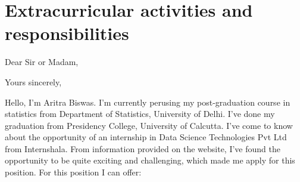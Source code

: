 \documentclass[11pt,a4paper,sans]{moderncv}        %
\begin{document}
\section{Extracurricular activities and responsibilities}
\begin{cvcolumns}
\end{cvcolumns}


\clearpage
\date{ 4th May 2016}
\opening{Dear Sir or Madam,}
\closing{Yours sincerely,}
\makelettertitle


Hello, \newline \newline I'm Aritra Biswas. I'm currently perusing my post-graduation course in statistics from Department of Statistics, University of Delhi. 
I've done my graduation from Presidency College, University of Calcutta. I've come to know about the opportunity of an internship in 
Data Science Technologies Pvt Ltd from Internshala. From information provided on the website, I've found the opportunity to be quite exciting and 
challenging, which made me apply for this position. For this position I can offer:
\newline
\end{document}
